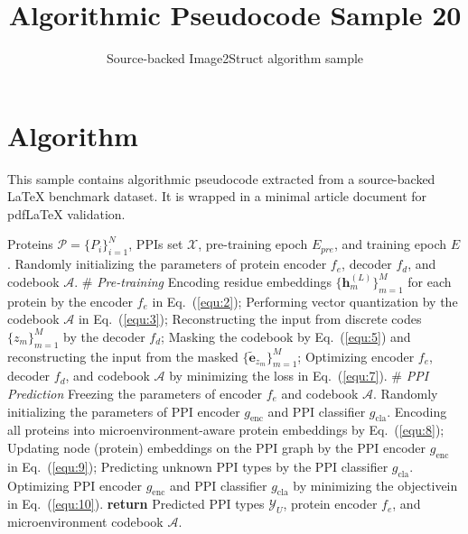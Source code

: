 \documentclass[11pt]{article}
\title{Algorithmic Pseudocode Sample 20}
\author{Source-backed Image2Struct algorithm sample}
\date{}
\begin{document}
\maketitle
\section{Algorithm}
This sample contains algorithmic pseudocode extracted from a source-backed LaTeX benchmark dataset. It is wrapped in a minimal article document for pdfLaTeX validation.

\begin{algorithm}[htbp]
\caption{Source-backed algorithmic procedure}
\begin{algorithm}
[!htbp]
\caption{Microenvironment-aware Protein Embedding for PPI Prediction (MAPE-PPI)}
\begin{algorithmic}[1]
\Require Proteins $\mathcal{P}=\{P_i\}_{i=1}^N$, PPIs set $\mathcal{X}$, pre-training epoch $E_{pre}$, and training epoch $E$.
\State Randomly initializing the parameters of protein encoder $f_e$, decoder $f_d$, and codebook $\mathcal{A}$.
\State \# \textit{Pre-training}
\State Encoding residue embeddings $\{\mathbf{h}^{(L)}_m\}_{m=1}^M$ for each protein by the encoder $f_e$ in Eq.~(\ref{equ:2});
\State Performing vector quantization by the codebook $\mathcal{A}$ in Eq.~(\ref{equ:3});
\State Reconstructing the input from discrete codes $\{z_m\}_{m=1}^M$ by the decoder $f_d$;
\State Masking the codebook by Eq.~(\ref{equ:5}) and reconstructing the input from the masked $\{\widetilde{\mathbf{e}}_{z_m}\}_{m=1}^M$;
\State Optimizing encoder $f_e$, decoder $f_d$, and codebook $\mathcal{A}$ by minimizing the loss in Eq.~(\ref{equ:7}).
\EndFor
\State \# \textit{PPI Prediction}
\State Freezing the parameters of encoder $f_e$ and codebook $\mathcal{A}$.
\State Randomly initializing the parameters of PPI encoder $g_{\text{enc}}$ and PPI classifier $g_{\text{cla}}$.
\State Encoding all proteins into microenvironment-aware protein embeddings by Eq.~(\ref{equ:8});
\State Updating node (protein) embeddings on the PPI graph by the PPI encoder $g_{\text{enc}}$ in Eq.~(\ref{equ:9});
\State Predicting unknown PPI types by the PPI classifier $g_{\text{cla}}$.
\State Optimizing PPI encoder $g_{\text{enc}}$ and PPI classifier $g_{\text{cla}}$ by minimizing the objectivein in Eq.~(\ref{equ:10}).
\EndFor
\State \textbf{return} Predicted PPI types $\mathcal{Y}_U$, protein encoder $f_e$, and microenvironment codebook $\mathcal{A}$.
\end{algorithmic}
\end{algorithm}
\vspace{-1em}
\end{algorithm}
\end{document}
